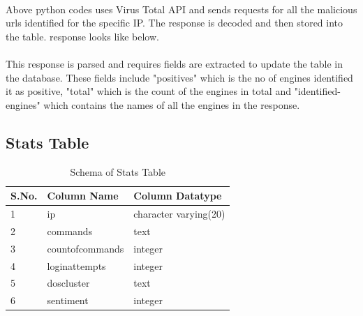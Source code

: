 \documentclass{report}
\begin{document}
 


 


 


 



\paragraph{}
Above python codes uses Virus Total API and sends requests for all the malicious urls identified for the specific IP. The response is decoded and then stored into the table. response looks like below.



\paragraph{}
This response is parsed and requires fields are extracted to update the table in the database. These fields include "positives" which is the no of engines identified it as positive, "total" which is the count of the engines in total  and "identified-engines" which contains the names of all the engines in the response.


\subsection{Stats Table}

\begin{table}[H]
\begin{tabular}{ |p{2cm}|p{5cm}|p{5cm}|  }
 \hline
 \textbf{S.No.} & \textbf{Column Name} & \textbf{Column Datatype}\\
 \hline
 \hline
 1 & ip & character varying(20) \\
 \hline
2 & commands & text \\
\hline
3 & countofcommands & integer \\
\hline
4 & loginattempts & integer \\
\hline
5 & doscluster & text \\
\hline
6 & sentiment & integer \\
\hline
\end{tabular}
 \caption{Schema of Stats Table}
\end{table}
\end{document}
